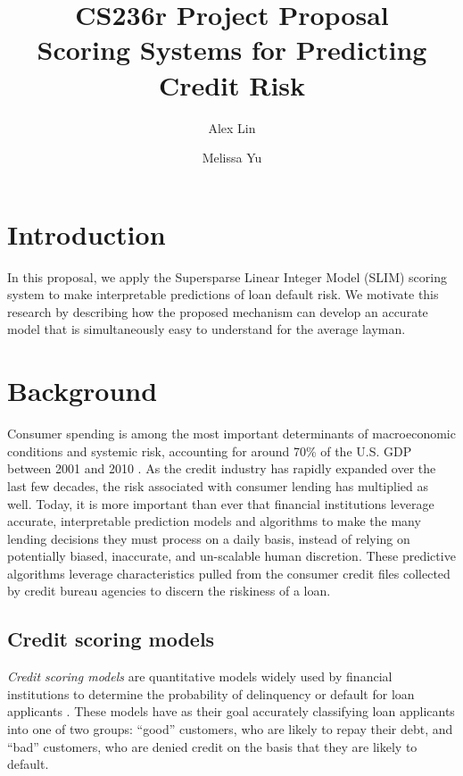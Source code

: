 \documentclass[11pt, margin=1in]{article}
\begin{document}
	
\title{CS236r Project Proposal \\ Scoring Systems for Predicting Credit Risk}
\author{Alex Lin \and Melissa Yu}
\date{}
\maketitle

\section{Introduction}
In this proposal, we apply the  Supersparse Linear Integer Model (SLIM) scoring system to make interpretable predictions of loan default risk. We motivate this research by describing how the proposed mechanism can develop an accurate model that is simultaneously easy to understand for the average layman.

\section{Background}

Consumer spending is among the most important determinants of macroeconomic conditions and systemic risk, accounting for around 70\% of the U.S. GDP between 2001 and 2010 \cite{ml-for-risk}. As the credit industry has rapidly expanded over the last few decades, the risk associated with consumer lending has multiplied as well. Today, it is more important than ever that financial institutions leverage accurate, interpretable prediction models and algorithms to make the many lending decisions they must process on a daily basis, instead of relying on potentially biased, inaccurate, and un-scalable human discretion. These predictive algorithms leverage characteristics pulled from the consumer credit files collected by credit bureau agencies to discern the riskiness of a loan.

\subsection{Credit scoring models} 
\textit{Credit scoring models} are quantitative models widely used by financial institutions to determine the probability of delinquency or default for loan applicants \cite{genetic-ong, nn-scoring-models}. These models have as their goal accurately classifying loan applicants into one of two groups: ``good'' customers, who are likely to repay their debt, and ``bad'' customers, who are denied credit on the basis that they are likely to default.
\end{document}

